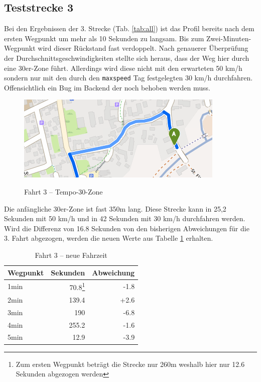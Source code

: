 \subsection{Teststrecke 3}

Bei den Ergebnissen der 3. Strecke (Tab. \ref{tab:all}) ist das Profil bereits nach dem ersten Wegpunkt um mehr als 10 Sekunden zu langsam.
Bis zum Zwei-Minuten-Wegpunkt wird dieser Rückstand fast verdoppelt.
Nach genauerer Überprüfung der Durchschnittsgeschwindigkeiten stellte sich heraus, dass der Weg hier durch eine 30er-Zone führt.
Allerdings wird diese nicht mit den erwarteten 50 km/h sondern nur mit den durch den \texttt{maxspeed} Tag festgelegten 30 km/h durchfahren.
Offensichtlich ein Bug im Backend der noch behoben werden muss.

\begin{figure}[h]
\centering
\caption{Fahrt 3 -- Tempo-30-Zone}
\label{fig:temp30}
\includegraphics[width = 0.60 \textwidth]{../media/Fahrt3_temp30.png} \\
\end{figure}

Die anfängliche 30er-Zone ist fast 350m lang.
Diese Strecke kann in 25,2 Sekunden mit 50 km/h und in 42 Sekunden mit 30 km/h durchfahren werden.
Wird die Differenz von 16.8 Sekunden von den bisherigen Abweichungen für die 3. Fahrt abgezogen, werden die neuen Werte aus Tabelle \ref{tab:new3} erhalten.

\begin{table}[h]
\centering
\caption{Fahrt 3 -- neue Fahrzeit}
\label{tab:new3}
\begin{tabular}{|l|r|r|}
\hline
Wegpunkt & Sekunden & Abweichung \\ \hline 
1min & 70.8\footnote{Zum ersten Wegpunkt beträgt die Strecke nur 260m weshalb hier nur 12.6 Sekunden abgezogen werden} & -1.8  \\
2min & 139.4 & +2.6  \\
3min & 190 & -6.8  \\
4min & 255.2 & -1.6  \\
5min & 12.9 & -3.9  \\
\hline
\end{tabular}
\end{table}

